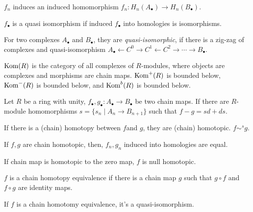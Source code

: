 \documentclass{article}
\begin{document}
\begin{theorem}
  \(f_n\) induces an induced homomorphism \(f_n: H_n(A_\bullet) \to H_n(B_\bullet)\).
\end{theorem}

\begin{definition}
  \(f_\bullet\) is a quasi isomorphism
  if induced \(f_\bullet\) into homologies is isomorphisms.
\end{definition}

\begin{definition}
  For two complexes \(A_\bullet\) and \(B_\bullet\),
  they are \emph{quasi-isomorphic},
  if there is a zig-zag of complexes and quasi-isomorphism
  \(A_\bullet \leftarrow C^0 \rightarrow C^1 \leftarrow C^2 \rightarrow \cdots \rightarrow B_\bullet\).
\end{definition}

\begin{definition}
  \(\textnormal{Kom}(R)\) is the category of all complexes of \(R\)-modules,
  where objects are complexes and morphisms are chain maps.
  \(\textnormal{Kom}^+(R)\) is bounded below,
  \(\textnormal{Kom}^-(R)\) is bounded below,
  and \(\textnormal{Kom}^b(R)\) is bounded below.
\end{definition}

\begin{definition}
  Let \(R\) be a ring with unity,
  \(f_\bullet, g_\bullet: A_\bullet \to B_\bullet\)
  be two chain maps.
  If there are \(R\)-module homomorphisms
  \(s = \{s_n \mid A_n \to B_{n+1}\}\)
  such that
  \(f - g = sd + ds\).

  If there is a (chain) homotopy between \(f\)and \(g\),
  they are (chain) homotopic. \(f \sim^s g\).
\end{definition}

\begin{theorem}
  If \(f, g\) are chain homotopic,
  then, \(f_n, g_n\) induced into homologies are equal.
\end{theorem}

\begin{definition}
  If chain map is homotopic to the zero map, \(f\) is null homotopic.
\end{definition}

\begin{definition}
  \(f\) is a chain homotopy equivalence
  if there is a chain map \(g\) such that \(g \circ f\) and \(f \circ g\) 
  are identity maps.
\end{definition}

\begin{theorem}
  If \(f\) is a chain homotomy equivalence, it's a quasi-isomorphism.
\end{theorem}
\end{document}
